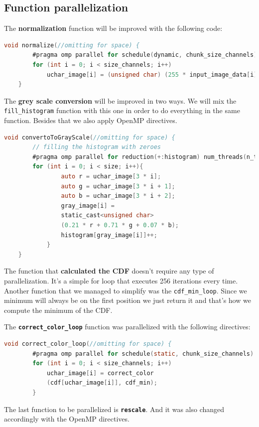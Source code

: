 \documentclass[sigconf]{acmart}
\begin{document}
\subsection{\textbf{Function parallelization}}

The \textbf{normalization} function will be improved with the following code:\\
\begin{lstlisting}[language=C, caption=Normalization Function]
	void normalize(//omitting for space) {
        #pragma omp parallel for schedule(dynamic, chunk_size_channels) num_threads(n_threads)
        for (int i = 0; i < size_channels; i++)
            uchar_image[i] = (unsigned char) (255 * input_image_data[i]);
    }
\end{lstlisting}
The \textbf{grey scale conversion} will be improved in two ways. We will mix the \texttt{fill\_histogram}
function with this one in order to do everything in the same function. Besides that we also apply OpenMP directives.
\begin{lstlisting}[language=C, caption=Grey Conversion Function]
	void convertoToGrayScale(//omitting for space) {
       	// filling the histogram with zeroes
        #pragma omp parallel for reduction(+:histogram) num_threads(n_threads)
        for (int i = 0; i < size; i++){
                auto r = uchar_image[3 * i];
                auto g = uchar_image[3 * i + 1];
                auto b = uchar_image[3 * i + 2];
                gray_image[i] = 
                static_cast<unsigned char>
                (0.21 * r + 0.71 * g + 0.07 * b);
                histogram[gray_image[i]]++;
            }
    }
\end{lstlisting}
The function that \textbf{calculated the CDF} doesn't require any type of parallelization. It's a simple for loop that executes 256 iterations every time.
Another function that we managed to simplify was the \texttt{cdf\_min\_loop}. Since we minimum will always be on the first position we just return it and that's how we compute
the minimum of the CDF.

The \texttt{\textbf{correct\_color\_loop}} function was parallelized with the following directives:
\begin{lstlisting}[language=C, caption=Color Correction Function]
	void correct_color_loop(//omitting for space) {
        #pragma omp parallel for schedule(static, chunk_size_channels) num_threads(n_threads)
        for (int i = 0; i < size_channels; i++)
            uchar_image[i] = correct_color
            (cdf[uchar_image[i]], cdf_min);
    	}
\end{lstlisting}
The last function to be parallelized is \texttt{\textbf{rescale}}. And it was also changed accordingly with
the OpenMP directives.
\end{document}
